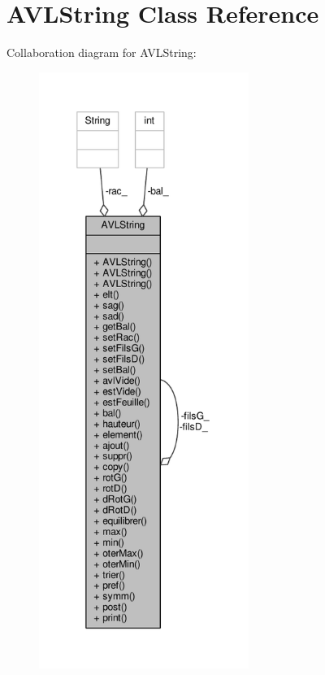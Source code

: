 \hypertarget{class_a_v_l_string}{\section{A\-V\-L\-String Class Reference}
\label{class_a_v_l_string}
}


Collaboration diagram for A\-V\-L\-String\-:\nopagebreak
\begin{figure}[H]
\begin{center}
\leavevmode
\includegraphics[height=550pt]{class_a_v_l_string__coll__graph}
\end{center}
\end{figure}
